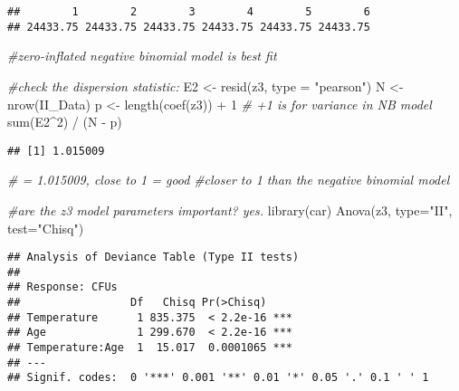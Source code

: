 \documentclass[
]{article}
\newenvironment{Shaded}{\begin{snugshade}}{\end{snugshade}}
\newcommand{\AttributeTok}[1]{\textcolor[rgb]{0.77,0.63,0.00}{#1}}
\newcommand{\CommentTok}[1]{\textcolor[rgb]{0.56,0.35,0.01}{\textit{#1}}}
\newcommand{\DecValTok}[1]{\textcolor[rgb]{0.00,0.00,0.81}{#1}}
\newcommand{\FunctionTok}[1]{\textcolor[rgb]{0.00,0.00,0.00}{#1}}
\newcommand{\NormalTok}[1]{#1}
\newcommand{\OtherTok}[1]{\textcolor[rgb]{0.56,0.35,0.01}{#1}}
\newcommand{\SpecialCharTok}[1]{\textcolor[rgb]{0.00,0.00,0.00}{#1}}
\newcommand{\StringTok}[1]{\textcolor[rgb]{0.31,0.60,0.02}{#1}}
\begin{document}
\begin{verbatim}
##        1        2        3        4        5        6 
## 24433.75 24433.75 24433.75 24433.75 24433.75 24433.75
\end{verbatim}

\begin{Shaded}
\begin{Highlighting}[]
\CommentTok{\#zero{-}inflated negative binomial model is best fit}

\CommentTok{\#check the dispersion statistic:}
\NormalTok{E2 }\OtherTok{\textless{}{-}} \FunctionTok{resid}\NormalTok{(z3, }\AttributeTok{type =} \StringTok{"pearson"}\NormalTok{)}
\NormalTok{N  }\OtherTok{\textless{}{-}} \FunctionTok{nrow}\NormalTok{(II\_Data)}
\NormalTok{p  }\OtherTok{\textless{}{-}} \FunctionTok{length}\NormalTok{(}\FunctionTok{coef}\NormalTok{(z3)) }\SpecialCharTok{+} \DecValTok{1}  \CommentTok{\# \textquotesingle{}+1\textquotesingle{} is for variance in NB model}
\FunctionTok{sum}\NormalTok{(E2}\SpecialCharTok{\^{}}\DecValTok{2}\NormalTok{) }\SpecialCharTok{/}\NormalTok{ (N }\SpecialCharTok{{-}}\NormalTok{ p) }
\end{Highlighting}
\end{Shaded}

\begin{verbatim}
## [1] 1.015009
\end{verbatim}

\begin{Shaded}
\begin{Highlighting}[]
\CommentTok{\# = 1.015009, close to 1 = good}
\CommentTok{\#closer to 1 than the negative binomial model}



\CommentTok{\#are the z3 model parameters important? yes.}
\FunctionTok{library}\NormalTok{(car)}
\FunctionTok{Anova}\NormalTok{(z3,}
      \AttributeTok{type=}\StringTok{"II"}\NormalTok{,}
      \AttributeTok{test=}\StringTok{"Chisq"}\NormalTok{)}
\end{Highlighting}
\end{Shaded}

\begin{verbatim}
## Analysis of Deviance Table (Type II tests)
## 
## Response: CFUs
##                 Df   Chisq Pr(>Chisq)    
## Temperature      1 835.375  < 2.2e-16 ***
## Age              1 299.670  < 2.2e-16 ***
## Temperature:Age  1  15.017  0.0001065 ***
## ---
## Signif. codes:  0 '***' 0.001 '**' 0.01 '*' 0.05 '.' 0.1 ' ' 1
\end{verbatim}
\end{document}
